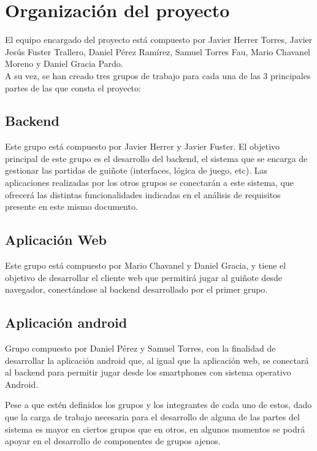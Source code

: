 \documentclass{article}
\begin{document}
\section{Organización del proyecto}
El equipo encargado del proyecto está compuesto por Javier Herrer Torres, Javier Jesús Fuster Trallero, Daniel Pérez Ramírez, Samuel Torres Fau, Mario Chavanel Moreno y Daniel Gracia Pardo. \\A su vez, se han creado tres grupos de trabajo para cada una de las 3 principales partes de las que consta el proyecto:
\subsection{Backend}
Este grupo está compuesto por Javier Herrer y Javier Fuster. El objetivo principal de este grupo es el desarrollo del backend, el sistema que se encarga de gestionar las partidas de guiñote (interfaces, lógica de juego, etc). Las aplicaciones realizadas por los otros grupos se conectarán a este sistema, que ofrecerá las distintas funcionalidades indicadas en el análisis de requisitos presente en este mismo documento.

\subsection{Aplicación Web}
Este grupo está compuesto por Mario Chavanel y Daniel Gracia, y tiene el objetivo de desarrollar el cliente web que permitirá jugar al guiñote desde navegador, conectándose al backend desarrollado por el primer grupo.

\subsection{Aplicación android}
Grupo compuesto por Daniel Pérez y Samuel Torres, con la finalidad de desarrollar la aplicación android que, al igual que la aplicación web, se conectará al backend para permitir jugar desde los smartphones con sistema operativo Android.

Pese a que estén definidos los grupos y los integrantes de cada uno de estos, dado que la carga de trabajo necesaria para el desarrollo de alguna de las partes del sistema es mayor en ciertos grupos que en otros, en algunos momentos se podrá apoyar en el desarrollo de componentes de grupos ajenos.
\end{document}
